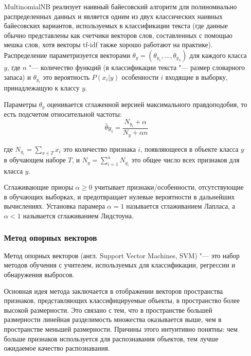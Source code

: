 \documentclass[bachelor, och, coursework]{SCWorks}
\begin{document}
            MultinomialNB реализует наивный байесовский алгоритм для
            полиномиально распределенных данных и является одним из двух
            классических наивных байесовских вариантов, используемых в
            классификации текста (где данные обычно представлены как счетчики
            векторов слов, составленных с помощью мешка слов, хотя векторы
            tf-idf также хорошо работают на практике). Распределение
            параметризуется векторами $\theta_y = (\theta_{y_1}, \dots,
            \theta_{y_n})$ для каждого класса $y$, где $n$ "--- количество
            функций (в классификации текста "--- размер словарного запаса) и
            $\theta_{y_i}$ это вероятность $P(x_i | y)$ особенности $i$ входящие
            в выборку, принадлежащую к классу $y$.

            Параметры $\theta_y$ оценивается сглаженной версией максимального
            правдоподобия, то есть подсчетом относительной частоты:
            $$\hat{\theta}{y_i} = \frac{N_{y_i} + \alpha}{N_y + \alpha n}$$

            где $N_{y_i} = \sum_{x \in T} x_i$ это количество признака $i$,
            появляющееся в объекте класса $y$ в обучающем наборе $T$, и $N_y =
            \sum_{i = 1}^{n} N_{y_i}$ это общее число всех признаков для класса
            $y$.

            Сглаживающие приоры $\alpha \geq 0$ учитывает признаки/особенности,
            отсутствующие в обучающих выборках, и предотвращает нулевые
            вероятности в дальнейших вычислениях. Установка парамера $\alpha =
            1$ называется сглаживанием Лапласа, а $\alpha < 1$ называется
            сглаживанием Лидстоуна.

        \subsubsection{Метод опорных векторов}


            Метод опорных векторов (англ. Support Vector Machines, SVM) "--- это
            набор методов обучения с учителем, используемых для классификации,
            регрессии и обнаружения выбросов.

            Основная идея метода заключается в отображении векторов пространства
            признаков, представляющих классифицируемые объекты, в пространство
            более высокой размерности. Это связано с тем, что в пространстве
            большей размерности линейная разделимость множества оказывается
            выше, чем в пространстве меньшей размерности. Причины этого
            интуитивно понятны: чем больше признаков используется для
            распознавания объектов, тем лучше ожидаемое качество распознавания.
\end{document}
